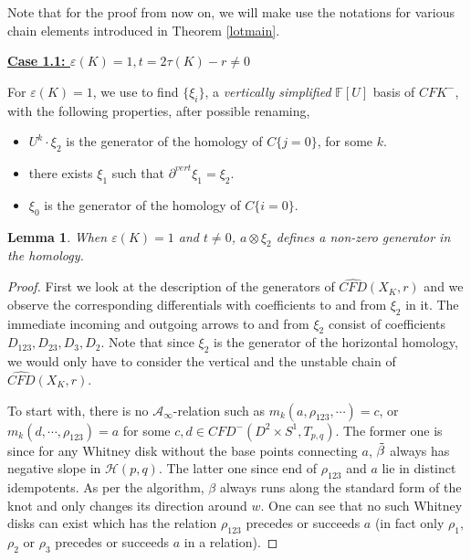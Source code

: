 \documentclass[11pt,reqno]{amsart}
\newtheorem {lemma}[theorem]{Lemma}
\theoremstyle{definition}
\newtheorem *{remark}{Remark}
\newcommand{\cfdhat}{\widehat{\mathit{CFD}}}
\newcommand{\cfkminus}{\mathit{CFK}^{-}}
\begin{document}
\vspace{.1in}

\noindent Note that for the proof from now on, we will make use the notations for various chain elements introduced in Theorem \ref{lotmain}.





\begin{subsection}{\underline{\textbf{Case 1.1: $\varepsilon(K)=1, t = 2 \tau(K) - r \neq 0$}}} 
\label{case1}

 
For $\varepsilon(K) = 1$, we use \cite[Lemma 3.2]{hom11} to find $\{ \xi_i \}$, a \emph{vertically simplified} $\mathbb{F}[U]$ basis of $\cfkminus$, with the following properties, after possible renaming, 
 \begin{itemize}
    \item $U^{k}\cdot \xi_2$ is the generator of the homology of $C\{j=0\}$, for some $k$. 
    \item there exists $\xi_1$ such that $\partial^{vert} \xi_1 = \xi_2.$ 
    \item $\xi_0$ is the generator of the homology of $C\{i=0\}.$
 \end{itemize}

\begin{lemma}
\label{lemma} 
When $\varepsilon(K) = 1$ and $t \neq 0$, $a \otimes \xi_2$ defines a non-zero generator in the homology.  
\end{lemma}
\begin{proof}
  First we look at the description of the generators of $\cfdhat(X_K,r)$ and we observe the corresponding differentials with coefficients to and from  $\xi_2$ in it. The immediate incoming and outgoing arrows to and from $\xi_2$ consist of coefficients $D_{123},D_{23}, D_3,D_2$. Note that since $\xi_2$ is the generator of the horizontal homology, we would only have to consider the vertical and the unstable chain of $\cfdhat(X_K,r)$.
  
To start with, there is no $\mathcal{A}_{\infty}$-relation such as $m_k(a,\rho_{123},\cdots) = c$, or $m_k(d,\cdots,\rho_{123}) = a$ for some $c,d \in CFD^{-}(D^2\times S^1, T_{p,q})$. The former one is since for any Whitney disk without the base points connecting $a$, $\Tilde{\beta}$ always has negative slope in $\mathcal{H}(p,q)$. The latter one since end of $\rho_{123}$ and $a$ lie in distinct idempotents. As per the algorithm, $\beta$ always runs along the standard form of the knot and only changes its direction around $w$. One can see that no such Whitney disks can exist which has the relation $\rho_{123}$ precedes or succeeds $a$ (in fact only $\rho_1$, $\rho_2$ or $\rho_3$ precedes or succeeds $a$ in a relation).


\end{proof}
\end{subsection}
\end{document}
